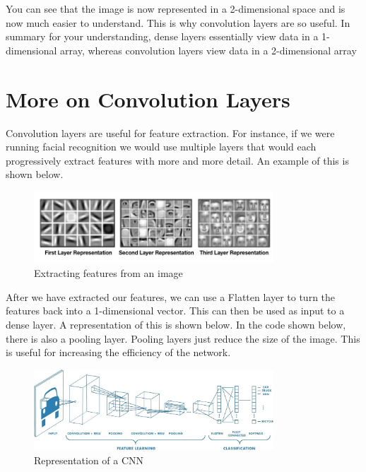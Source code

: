 \documentclass[11pt]{report}
\begin{document}
\pagebreak

You can see that the image is now represented in a 2-dimensional space and is now much easier to understand. This is why convolution layers are so useful. 
In summary for your understanding, dense layers essentially view data in a 1-dimensional array, whereas convolution layers view data in a 2-dimensional array

\section{More on Convolution Layers}
Convolution layers are useful for feature extraction. For instance, if we were running facial recognition we would use multiple layers that would each progressively extract features with more and more detail. An example of this is shown below.

\begin{figure}[h]
\centering
\includegraphics[width=0.8\textwidth]{./images/featureextraction.jpg}
\caption{Extracting features from an image}
\label{fig:conv1}
\end{figure}

After we have extracted our features, we can use a Flatten layer to turn the features back into a 1-dimensional vector. This can then be used as input to a dense layer. A representation of this is shown below. In the code shown below, there is also a pooling layer. Pooling layers just reduce the size of the image. This is useful for increasing the efficiency of the network.

\begin{figure}[h]
\centering
\includegraphics[width=0.8\textwidth]{./images/convexamp.jpeg}
\caption{Representation of a CNN}
\label{fig:cnn}
\end{figure}
\end{document}
